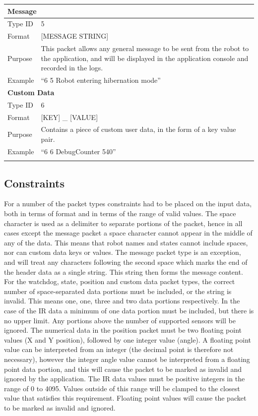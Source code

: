 \begin{longtable}{ l p{12cm} }
 \hline
 \multicolumn{2}{p{12cm}}{\textbf{Message}}\\
 \hline
 Type ID & 5 \\
 Format & [MESSAGE STRING]\\
 Purpose & This packet allows any general message to be sent from the robot to the application, and will be displayed in the application console and recorded in the logs. \\
 Example & ``6 5 Robot entering hibernation mode''\\
 
 \hline
 \multicolumn{2}{p{12cm}}{\textbf{Custom Data}}\\
 \hline
 Type ID & 6 \\
 Format & [KEY] \_ [VALUE]\\
 Purpose & Contains a piece of custom user data, in the form of a key value pair. \\
 Example & ``6 6 DebugCounter 540''\\
	
 \label{tab:DataFormat}
\end{longtable}

\subsection{Constraints}
For a number of the packet types constraints had to be placed on the input data, both in terms of format and in terms of the range of valid values. The space character is used as a delimiter to separate portions of the packet, hence in all cases except the message packet a space character cannot appear in the middle of any of the data. This means that robot names and states cannot include spaces, nor can custom data keys or values. The message packet type is an exception, and will treat any characters following the second space which marks the end of the header data as a single string. This string then forms the message content. For the watchdog, state, position and custom data packet types, the correct number of space-separated data portions must be included, or the string is invalid. This means one, one, three and two data portions respectively. In the case of the IR data a minimum of one data portion must be included, but there is no upper limit. Any portions above the number of supported sensors will be ignored. The numerical data in the position packet must be two floating point values (X and Y position), followed by one integer value (angle). A floating point value can be interpreted from an integer (the decimal point is therefore not necessary), however the integer angle value cannot be interpreted from a floating point data portion, and this will cause the packet to be marked as invalid and ignored by the application. The IR data values must be positive integers in the range of 0 to 4095. Values outside of this range will be clamped to the closest value that satisfies this requirement. Floating point values will cause the packet to be marked as invalid and ignored.

